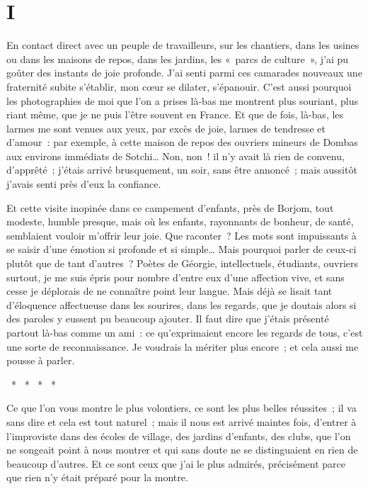 \documentclass[french,twoside]{book} %
\newcommand\chapteropen{} %
\newcommand\chaptercont{} %
\begin{document}
\chapteropen

\chapter[{I}]{I}
\renewcommand{\leftmark}{I}


\chaptercont
\noindent En contact direct avec un peuple de travailleurs, sur les chantiers, dans les usines ou dans les maisons de repos, dans les jardins, les « parcs de culture », j’ai pu goûter des instants de joie profonde. J’ai senti parmi ces camarades nouveaux une fraternité subite s’établir, mon cœur se dilater, s’épanouir. C’est aussi pourquoi les photographies de moi que l’on a prises là-bas me montrent plus souriant, plus riant même, que je ne puis l’être souvent en France. Et que de fois, là-bas, les larmes me sont venues aux yeux, par excès de joie, larmes de tendresse et d’amour : par exemple, à cette maison de repos des ouvriers mineurs de Dombas aux environs immédiats de Sotchi… Non, non ! il n’y avait là rien de convenu, d’apprêté ; j’étais arrivé brusquement, un soir, sans être annoncé ; mais aussitôt j’avais senti près d’eux la confiance.\par
Et cette visite inopinée dans ce campement d’enfants, près de Borjom, tout modeste, humble presque, mais où les enfants, rayonnants de bonheur, de santé, semblaient vouloir m’offrir leur joie. Que raconter ? Les mots sont impuissants à se saisir d’une émotion si profonde et si simple… Mais pourquoi parler de ceux-ci plutôt que de tant d’autres ? Poètes de Géorgie, intellectuels, étudiants, ouvriers surtout, je me suis épris pour nombre d’entre eux d’une affection vive, et sans cesse je déplorais de ne connaître point leur langue. Mais déjà se lisait tant d’éloquence affectueuse dans les sourires, dans les regards, que je doutais alors si des paroles y eussent pu beaucoup ajouter. Il faut dire que j’étais présenté partout là-bas comme un ami : ce qu’exprimaient encore les regards de tous, c’est une sorte de reconnaissance. Je voudrais la mériter plus encore ; et cela aussi me pousse à parler.\par
{\centering \noindent *  *  *  *  *\par}
\noindent Ce que l’on vous montre le plus volontiers, ce sont les plus belles réussites ; il va sans dire et cela est tout naturel ; mais il nous est arrivé maintes fois, d’entrer à l’improviste dans des écoles de village, des jardins d’enfants, des clubs, que l’on ne songeait point à nous montrer et qui sans doute ne se distinguaient en rien de beaucoup d’autres. Et ce sont ceux que j’ai le plus admirés, précisément parce que rien n’y était préparé pour la montre.\par
\end{document}
